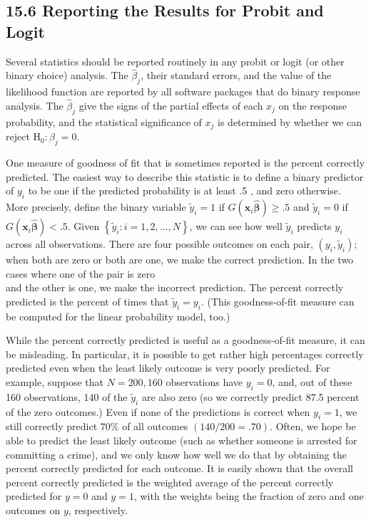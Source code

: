 \documentclass[10pt]{article}
\begin{document}
\subsection*{15.6 Reporting the Results for Probit and Logit}
Several statistics should be reported routinely in any probit or logit (or other binary choice) analysis. The $\hat{\beta}_{j}$, their standard errors, and the value of the likelihood function are reported by all software packages that do binary response analysis. The $\hat{\beta}_{j}$ give the signs of the partial effects of each $x_{j}$ on the response probability, and the statistical significance of $x_{j}$ is determined by whether we can reject $\mathrm{H}_{0}: \beta_{j}=0$.

One measure of goodness of fit that is sometimes reported is the percent correctly predicted. The easiest way to describe this statistic is to define a binary predictor of $y_{i}$ to be one if the predicted probability is at least .5 , and zero otherwise. More precisely, define the binary variable $\tilde{y}_{i}=1$ if $G\left(\mathbf{x}_{i} \hat{\boldsymbol{\beta}}\right) \geq .5$ and $\tilde{y}_{i}=0$ if $G\left(\mathbf{x}_{i} \hat{\boldsymbol{\beta}}\right)<.5$. Given $\left\{\tilde{y}_{i}: i=1,2, \ldots, N\right\}$, we can see how well $\tilde{y}_{i}$ predicts $y_{i}$ across all observations. There are four possible outcomes on each pair, $\left(y_{i}, \tilde{y}_{i}\right)$; when both are zero or both are one, we make the correct prediction. In the two cases where one of the pair is zero\\
and the other is one, we make the incorrect prediction. The percent correctly predicted is the percent of times that $\tilde{y}_{i}=y_{i}$. (This goodness-of-fit measure can be computed for the linear probability model, too.)

While the percent correctly predicted is useful as a goodness-of-fit measure, it can be misleading. In particular, it is possible to get rather high percentages correctly predicted even when the least likely outcome is very poorly predicted. For example, suppose that $N=200,160$ observations have $y_{i}=0$, and, out of these 160 observations, 140 of the $\tilde{y}_{i}$ are also zero (so we correctly predict 87.5 percent of the zero outcomes.) Even if none of the predictions is correct when $y_{i}=1$, we still correctly predict $70 \%$ of all outcomes $(140 / 200=.70)$. Often, we hope be able to predict the least likely outcome (such as whether someone is arrested for committing a crime), and we only know how well we do that by obtaining the percent correctly predicted for each outcome. It is easily shown that the overall percent correctly predicted is the weighted average of the percent correctly predicted for $y=0$ and $y=1$, with the weights being the fraction of zero and one outcomes on $y$, respectively.
\end{document}
